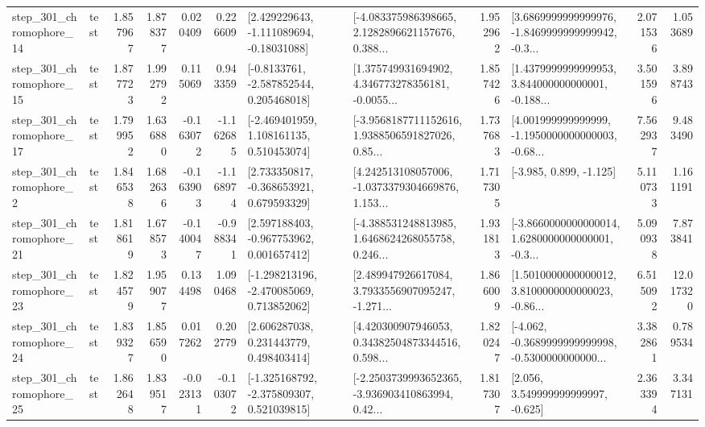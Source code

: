 \begin{tabular}{llrrrrllrlrr}
  step\_301\_chromophore\_14 &      test &      1.857967 &    1.878377 &      0.020409 &  0.226609 &    [2.429229643, -1.111089694, -0.18031088] &  [-4.083375986398665, 2.1282896621157676, 0.388... &       1.952962 &  [3.6869999999999976, -1.8469999999999942, -0.3... &            2.071536 &          1.053689 \\
  step\_301\_chromophore\_15 &      test &      1.877723 &    1.992792 &      0.115069 &  0.943359 &     [-0.8133761, -2.587852544, 0.205468018] &  [1.375749931694902, 4.346773278356181, -0.0055... &       1.857426 &  [1.4379999999999953, 3.844000000000001, -0.188... &            3.501596 &          3.898743 \\
  step\_301\_chromophore\_17 &      test &      1.799952 &    1.636880 &     -0.163072 & -1.162685 &    [-2.469401959, 1.108161135, 0.510453074] &  [-3.9568187711152616, 1.9388506591827026, 0.85... &       1.737683 &  [4.001999999999999, -1.1950000000000003, -0.68... &            7.562937 &          9.483490 \\
   step\_301\_chromophore\_2 &      test &      1.846538 &    1.682636 &     -0.163903 & -1.168974 &    [2.733350817, -0.368653921, 0.679593329] &  [4.242513108057006, -1.0373379304669876, 1.153... &       1.717305 &                            [-3.985, 0.899, -1.125] &            5.110733 &          1.161191 \\
  step\_301\_chromophore\_21 &      test &      1.818619 &    1.678573 &     -0.140047 & -0.988341 &    [2.597188403, -0.967753962, 0.001657412] &  [-4.388531248813985, 1.6468624268055758, 0.246... &       1.931813 &  [-3.8660000000000014, 1.6280000000000001, -0.3... &            5.090938 &          7.873841 \\
  step\_301\_chromophore\_23 &      test &      1.824579 &    1.959077 &      0.134498 &  1.090468 &   [-1.298213196, -2.470085069, 0.713852062] &  [2.489947926617084, 3.7933556907095247, -1.271... &       1.866009 &  [1.5010000000000012, 3.8100000000000023, -0.86... &            6.515092 &         12.017320 \\
  step\_301\_chromophore\_24 &      test &      1.839327 &    1.856590 &      0.017262 &  0.202779 &     [2.606287038, 0.231443779, 0.498403414] &  [4.420300907946053, 0.34382504873344516, 0.598... &       1.820247 &  [-4.062, -0.3689999999999998, -0.5300000000000... &            3.382861 &          0.789534 \\
  step\_301\_chromophore\_25 &      test &      1.862648 &    1.839517 &     -0.023131 & -0.103072 &   [-1.325168792, -2.375809307, 0.521039815] &  [-2.2503739993652365, -3.936903410863994, 0.42... &       1.817307 &                 [2.056, 3.549999999999997, -0.625] &            2.363394 &          3.347131 \\

\end{tabular}
